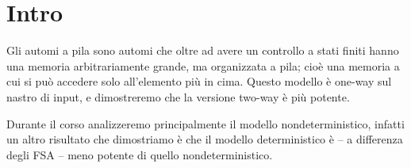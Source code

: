 \documentclass[12pt]{report}
\theoremstyle{definition}
\theoremstyle{regard}
\begin{document}
\tableofcontents
\newpage

\chapter{Intro}
Gli automi a pila sono automi che oltre ad avere un controllo a stati finiti hanno una memoria arbitrariamente grande, ma organizzata a pila; cioè una memoria a cui si può accedere solo all'elemento più in cima.
Questo modello è one-way sul nastro di input, e dimostreremo che la versione two-way è più potente. %

Durante il corso analizzeremo principalmente il modello nondeterministico, infatti un altro risultato che dimostriamo %
è che il modello deterministico è -- a differenza degli FSA -- meno potente di quello nondeterministico.
\end{document}
